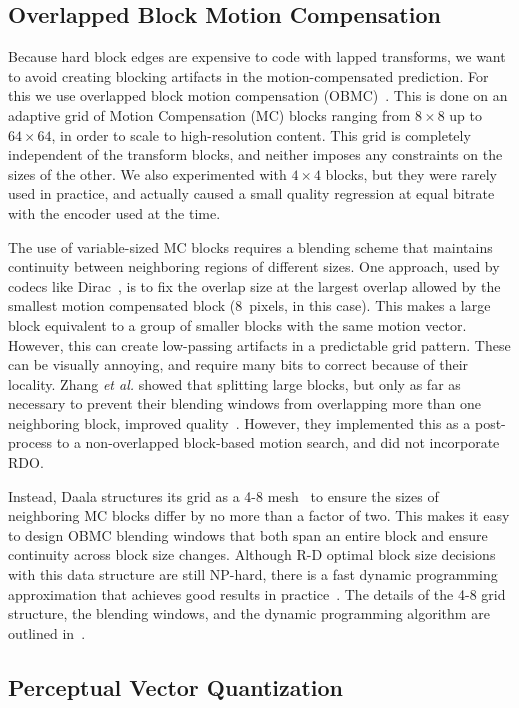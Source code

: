 \documentclass[english,conference,10pt]{IEEEtran}
\begin{document}
\subsection{Overlapped Block Motion Compensation}

Because hard block edges are expensive to code with lapped transforms, we
want to avoid creating blocking artifacts in the motion-compensated
prediction. For this we use overlapped block motion compensation
(OBMC)~\cite{OBMC}. This is done on an adaptive grid of Motion Compensation
(MC) blocks ranging from $8\times 8$ up to $64\times 64$, in order to scale to
high-resolution content. This grid is completely independent of the transform
blocks, and neither imposes any constraints on the sizes of the other. We also
experimented with $4\times 4$ blocks, but they were rarely used in practice,
and actually caused a small quality regression at equal bitrate with the
encoder used at the time.

The use of variable-sized MC blocks requires a blending scheme that maintains
continuity between neighboring regions of different sizes. One approach, used
by codecs like Dirac~\cite{Dirac}, is to fix the overlap size at the largest
overlap allowed by the smallest motion compensated block (8~pixels, in this
case). This makes a large
block equivalent to a group of smaller blocks with the same motion vector.
However, this can create low-passing artifacts in a predictable grid pattern.
These can be visually annoying, and require many bits to correct because of
their locality. Zhang \textit{et al.} showed that splitting large blocks,
but only as far as necessary to prevent their blending windows from
overlapping more than one neighboring block, improved quality~\cite{ZAS98}.
However, they implemented this as a post-process to a non-overlapped
block-based motion search, and did not incorporate RDO\@.

Instead, Daala structures its grid as a 4-8 mesh~\cite{DWSMAM97} to ensure the
sizes of neighboring MC blocks differ by no more than a factor of two. This
makes it easy to design OBMC blending windows that both span an entire block
and ensure continuity across block size changes. Although R-D optimal block
size decisions with this data structure are still NP-hard, there is a fast
dynamic programming approximation that achieves good results in
practice~\cite{Bal01}. The details of the 4-8 grid structure, the blending
windows, and the dynamic programming algorithm are outlined in~\cite{OBMC}.

\subsection{Perceptual Vector Quantization}
\end{document}
